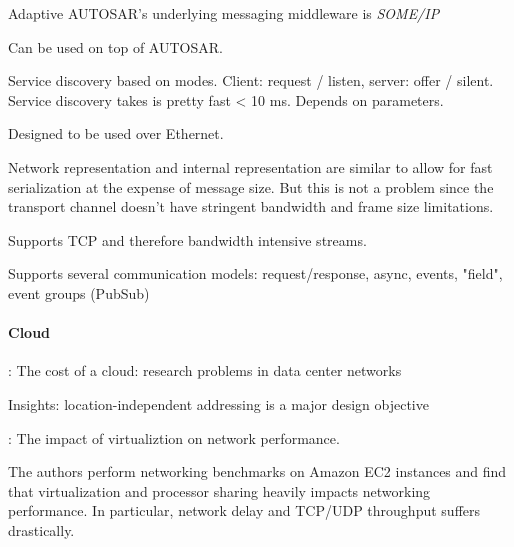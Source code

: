 Adaptive AUTOSAR's underlying messaging middleware is \emph{SOME/IP}

Can be used on top of AUTOSAR.

Service discovery based on modes. Client: request / listen, server: offer / silent.
Service discovery takes is pretty fast < 10 ms. Depends on parameters.

Designed to be used over Ethernet.

Network representation and internal representation are similar to allow for fast serialization at the expense of message size. But this is not a problem since the transport channel doesn't have stringent bandwidth and frame size limitations.

Supports TCP and therefore bandwidth intensive streams.

Supports several communication models: request/response, async, events, "field", event groups (PubSub)


\paragraph{Cloud}
\cite{greenberg2008cost}: The cost of a cloud: research problems in data center networks

Insights: location-independent addressing is a major design objective




\cite{wang2010impact}: The impact of virtualiztion on network performance.

The authors perform networking benchmarks on Amazon EC2 instances and find that virtualization and processor sharing heavily impacts networking performance. In particular, network delay and TCP/UDP throughput suffers drastically.

